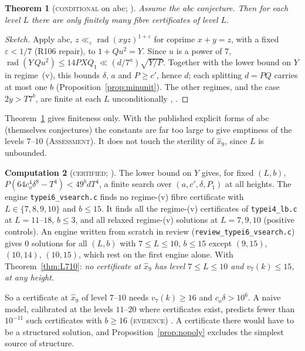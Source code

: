 \documentclass[11pt,reqno]{amsart}
\newtheorem{theorem}{Theorem}[section]
\theoremstyle{definition}
\newtheorem{computation}[theorem]{Computation}
\newcommand{\status}[1]{\textup{\textsc{#1}}}
\begin{document}
\begin{theorem}[\status{conditional} on abc; {\cite[Thm.~3.2]{PT6}}]\label{thm:abc}
Assume the abc conjecture.  Then for each level $L$ there are only
finitely many fibre certificates of level $L$.
\end{theorem}

\begin{proof}[Sketch]
Apply abc, $z\ll_\varepsilon\operatorname{rad}(xyz)^{1+\varepsilon}$ for
coprime $x+y=z$, with a fixed $\varepsilon<1/7$ (R106 repair), to $1+Qu^2=Y$.  Since $u$ is a power of $7$,
$\operatorname{rad}(Y\,Qu^2)\le14PXQ_1\ll(d/7^a)\sqrt{Y/P}$.  Together with
the lower bound on $Y$ in regime~(v), this bounds $\delta$, $a$ and
$P\ge c'$, hence $d$; each splitting $d=PQ$ carries at most one $b$
(Proposition~\ref{prop:minunit}).  The other regimes, and the case
$2y>T7^b$, are finite at each $L$ unconditionally \cite[Prop.~3.3]{PT5},
\cite[\S3]{PT6}.
\end{proof}

Theorem~\ref{thm:abc} gives finiteness only.  With the published
explicit forms of abc (themselves conjectures) the constants are far too
large to give emptiness of the levels $7$--$10$ \cite[\S3]{PT6}
(\status{Assessment}).  It does not touch the sterility of $\hat x_9$,
since $L$ is unbounded.

\begin{computation}[\status{certified}; {\cite[Comp.~4.1, Cor.~4.2]{PT6}}]\label{comp:b15}
The lower bound on $Y$ gives, for fixed $(L,b)$,
$P(64c_o^4\delta^8-T^4)<49^bdT^4$, a finite search over
$(a,c',\delta,P_1)$ at all heights.  The engine \texttt{typei6\_vsearch.c}
finds no regime-(v) fibre certificate with $L\in\{7,8,9,10\}$ and
$b\le15$.  It finds all the regime-(v) certificates of
\texttt{typei4\_lb.c} at $L=11$--$18$, $b\le3$, and all relaxed regime-(v)
solutions at $L=7,9,10$ (positive controls).  An engine written from
scratch in review (\texttt{review\_typei6\_vsearch.c}) gives $0$ solutions
for all $(L,b)$ with $7\le L\le10$, $b\le15$ except $(9,15)$, $(10,14)$,
$(10,15)$, which rest on the first engine alone.  With
Theorem~\ref{thm:L710}: \emph{no certificate at $\hat x_9$ has level
$7\le L\le10$ and $v_7(k)\le15$, at any height.}
\end{computation}

So a certificate at $\hat x_9$ of level $7$--$10$ needs $v_7(k)\ge16$ and
$c_o\delta>10^6$.  A naive model, calibrated at the levels $11$--$20$
where certificates exist, predicts fewer than $10^{-11}$ such
certificates with $b\ge16$ (\status{evidence}) \cite[\S5]{PT6}.  A
certificate there would have to be a structured solution, and
Proposition~\ref{prop:nopoly} excludes the simplest source of structure.
\end{document}
